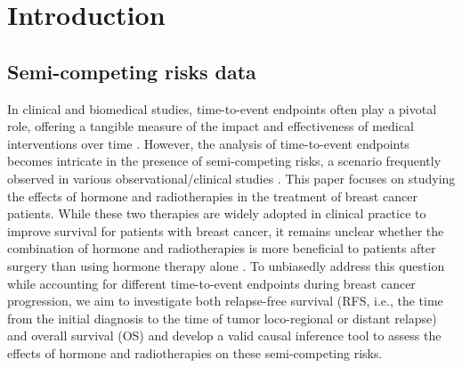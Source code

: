 \documentclass[aoas]{imsart}
\theoremstyle{plain}
\begin{document}
\section{Introduction}



\label{s:intro}
\subsection{Semi-competing risks data}
 In clinical and biomedical studies, time-to-event endpoints often play a pivotal role, offering a tangible measure of the impact and effectiveness of medical interventions over time \citep{cohen2022clinical}. 
However, the analysis of time-to-event endpoints becomes intricate in the presence of semi-competing risks, a scenario frequently observed in various observational/clinical studies \citep{mao2021statistical}. This paper focuses on studying the effects of hormone and radiotherapies in the treatment of breast cancer patients. While these two therapies are widely adopted in clinical practice to improve survival for patients with breast cancer, it remains unclear whether the combination of hormone and radiotherapies is more beneficial to patients after surgery than using hormone therapy alone \citep{mayer2014,mcduff2022optimizing}. To unbiasedly address this question while accounting for different time-to-event endpoints during breast cancer progression, we aim to investigate both relapse-free survival (RFS, i.e., the time from the initial diagnosis to the time of tumor loco-regional or distant relapse) and overall survival (OS) and develop a valid causal inference tool to assess the effects of hormone and radiotherapies on these semi-competing risks.
\end{document}
